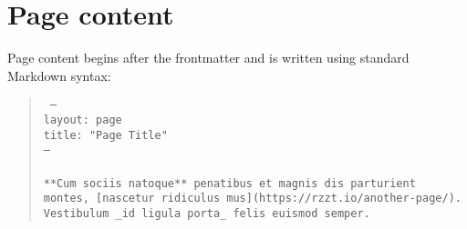\section{Page content}

Page content begins after the frontmatter and is written using standard Markdown syntax:

\begin{quote}
  \texttt{%
    ---\\
    layout: page\\
    title: "Page Title"\\
    ---\\
    \\
    **Cum sociis natoque** penatibus et magnis dis parturient montes, [nascetur ridiculus mus](https://rzzt.io/another-page/). Vestibulum \_id ligula porta\_ felis euismod semper.
  }
\end{quote}

